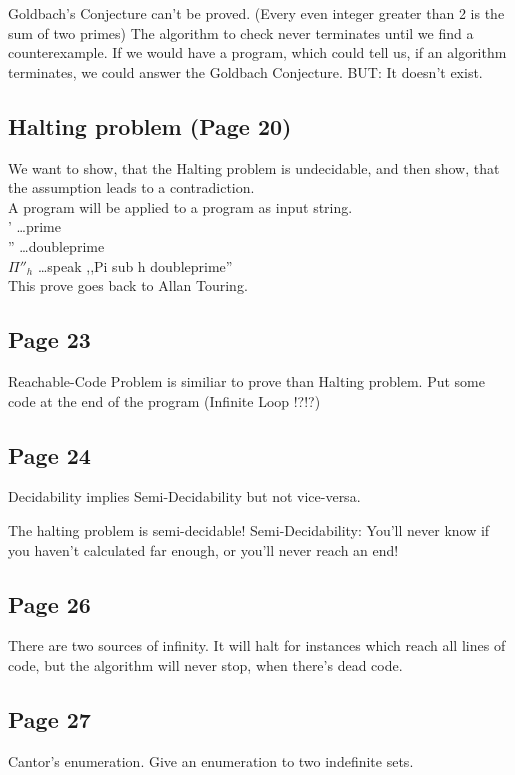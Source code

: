 \documentclass[a4paper]{article}
\begin{document}
Goldbach's Conjecture can't be proved. (Every even integer greater than 2 is
the sum of two primes) The algorithm to check never terminates until we find a
counterexample. If we would have a program, which could tell us, if an algorithm
terminates, we could answer the Goldbach Conjecture. BUT: It doesn't exist.

\subsection{Halting problem (Page 20)}
We want to show, that the Halting problem is undecidable, and then show, that
the assumption leads to a contradiction.\\

A program will be applied to a program as input string. \\
' \ldots prime \\
'' \ldots doubleprime \\

$\Pi''_h $ \ldots speak ,,Pi sub h doubleprime'' \\

This prove goes back to Allan Touring.
\subsection{Page 23}
Reachable-Code Problem is similiar to prove than Halting problem.
Put some code at the end of the program (Infinite Loop !?!?)

\subsection{Page 24}
Decidability implies Semi-Decidability but not vice-versa.

The halting problem is semi-decidable!
Semi-Decidability: You'll never know if you haven't calculated far enough, or
you'll never reach an end!


\subsection{Page 26}
There are two sources of infinity.
It will halt for instances which reach all lines of code, but the algorithm will
never stop, when there's dead code.

\subsection{Page 27}
Cantor's enumeration. Give an enumeration to two indefinite sets.
\end{document}
